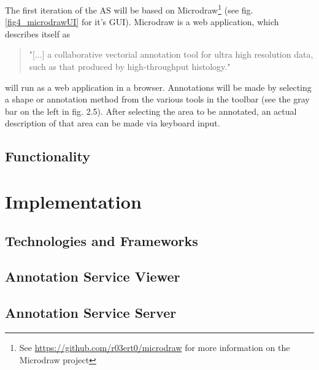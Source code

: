 The first iteration of the AS will be based on Microdraw\footnote{See \url{https://github.com/r03ert0/microdraw} for more information on the Microdraw project} (see fig. \ref{fig4_microdrawUI} for it's GUI). Microdraw is a web application, which describes itself as

\begin{quotation}
	"[...] a collaborative vectorial annotation tool for ultra high resolution data, such as that produced by high-throughput histology." \cite{web:microdraw}
\end{quotation}

will run as a web application in a browser. Annotations will be made by selecting a shape or annotation method from the various tools in the toolbar (see the gray bar on the left in fig. 2.5). After selecting the area to be annotated, an actual description of that area can be made via keyboard input.


\subsection{Functionality}

\section{Implementation}
\subsection{Technologies and Frameworks}
\subsection{Annotation Service Viewer}
\subsection{Annotation Service Server}
